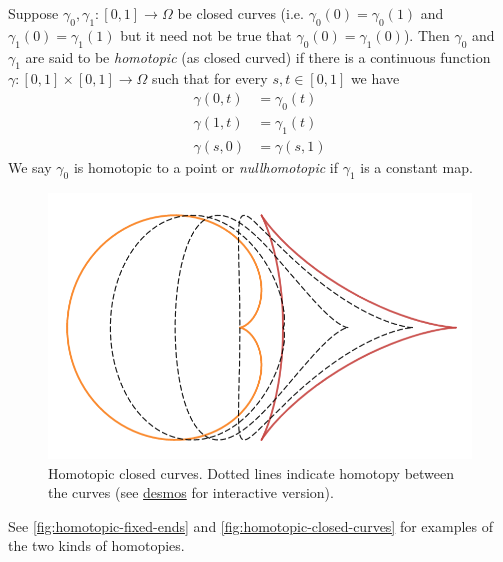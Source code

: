 \begin{definition}
Suppose $\gamma_0, \gamma_1: [0, 1] \to \Omega$ be closed curves (i.e. $\gamma_0(0) = \gamma_0(1)$ and $\gamma_1(0) = \gamma_1(1)$ but it need not be true that $\gamma_0(0) = \gamma_1(0)$). Then $\gamma_0$ and $\gamma_1$ are said to be \textit{homotopic} (as closed curved) if there is a continuous function $\gamma: [0, 1] \times [0, 1] \to \Omega$ such that for every $s, t \in [0, 1]$ we have
\begin{align*}
    \gamma(0, t) &= \gamma_0(t)\\
    \gamma(1, t) &= \gamma_1(t)\\
    \gamma(s, 0) &= \gamma(s, 1)
\end{align*}
We say $\gamma_0$ is homotopic to a point or \textit{nullhomotopic} if $\gamma_1$ is a constant map.
\end{definition}
\begin{figure}
    \centering
    \includegraphics[scale=0.7]{Images/homotopy_example_closed_curves.png}
    \caption{Homotopic closed curves. Dotted lines indicate homotopy between the curves (see \href{https://www.desmos.com/calculator/ihxwimjylv}{desmos} for interactive version).}
    \label{fig:homotopic-closed-curves}
\end{figure}

See \autoref{fig:homotopic-fixed-ends} and \autoref{fig:homotopic-closed-curves} for examples of the two kinds of homotopies.\\


